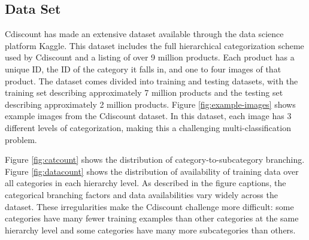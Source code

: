 \subsection{Data Set}





Cdiscount has made an extensive dataset available through the data science platform Kaggle.
This dataset includes the full hierarchical categorization scheme used by Cdiscount and a listing of over 9 million products.
Each product has a unique ID, the ID of the category it falls in, and one to four images of that product.
The dataset comes divided into training and testing datasets, with the training set describing approximately 7 million products and the testing set describing approximately 2 million products.
Figure \ref{fig:example-images} shows example images from the Cdiscount dataset.
In this dataset, each image has 3 different levels of categorization, making this a challenging multi-classification problem.

Figure \ref{fig:catcount} shows the distribution of category-to-subcategory branching.
Figure \ref{fig:datacount} shows the distribution of availability of training data over all categories in each hierarchy level.
As described in the figure captions, the categorical branching factors and data availabilities vary widely across the dataset.
These irregularities make the Cdiscount challenge more difficult: some categories have many fewer training examples than other categories at the same hierarchy level and some categories have many more subcategories than others.

